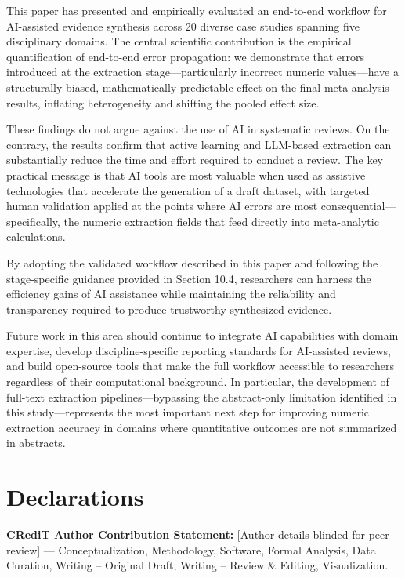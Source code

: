 \documentclass[12pt]{article}
\begin{document}
This paper has presented and empirically evaluated an end-to-end workflow for AI-assisted evidence synthesis across 20 diverse case studies spanning five disciplinary domains. The central scientific contribution is the empirical quantification of end-to-end error propagation: we demonstrate that errors introduced at the extraction stage---particularly incorrect numeric values---have a structurally biased, mathematically predictable effect on the final meta-analysis results, inflating heterogeneity and shifting the pooled effect size.

These findings do not argue against the use of AI in systematic reviews. On the contrary, the results confirm that active learning and LLM-based extraction can substantially reduce the time and effort required to conduct a review. The key practical message is that AI tools are most valuable when used as assistive technologies that accelerate the generation of a draft dataset, with targeted human validation applied at the points where AI errors are most consequential---specifically, the numeric extraction fields that feed directly into meta-analytic calculations.

By adopting the validated workflow described in this paper and following the stage-specific guidance provided in Section 10.4, researchers can harness the efficiency gains of AI assistance while maintaining the reliability and transparency required to produce trustworthy synthesized evidence.

Future work in this area should continue to integrate AI capabilities with domain expertise, develop discipline-specific reporting standards for AI-assisted reviews, and build open-source tools that make the full workflow accessible to researchers regardless of their computational background. In particular, the development of full-text extraction pipelines---bypassing the abstract-only limitation identified in this study---represents the most important next step for improving numeric extraction accuracy in domains where quantitative outcomes are not summarized in abstracts.




\section*{Declarations}

\textbf{CRediT Author Contribution Statement:}
[Author details blinded for peer review] --- Conceptualization, Methodology, Software, Formal Analysis, Data Curation, Writing -- Original Draft, Writing -- Review \& Editing, Visualization.
\end{document}
